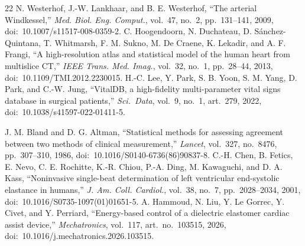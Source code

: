 \documentclass[journal]{IEEEtran}
\begin{document}
\begin{thebibliography}{22}
 N. Westerhof, J.-W. Lankhaar, and B. E. Westerhof, ``The arterial Windkessel,'' \emph{Med. Biol. Eng. Comput.}, vol.~47, no.~2, pp.~131--141, 2009, doi:~10.1007/s11517-008-0359-2.
 C. Hoogendoorn, N. Duchateau, D. S\'{a}nchez-Quintana, T. Whitmarsh, F. M. Sukno, M. De Craene, K. Lekadir, and A. F. Frangi, ``A high-resolution atlas and statistical model of the human heart from multislice CT,'' \emph{IEEE Trans. Med. Imag.}, vol.~32, no.~1, pp.~28--44, 2013, doi:~10.1109/TMI.2012.2230015.
 H.-C. Lee, Y. Park, S. B. Yoon, S. M. Yang, D. Park, and C.-W. Jung, ``VitalDB, a high-fidelity multi-parameter vital signs database in surgical patients,'' \emph{Sci.~Data}, vol.~9, no.~1, art.~279, 2022, doi:~10.1038/s41597-022-01411-5.

 J. M. Bland and D. G. Altman, ``Statistical methods for assessing agreement between two methods of clinical measurement,'' \emph{Lancet}, vol.~327, no.~8476, pp.~307--310, 1986, doi:~10.1016/S0140-6736(86)90837-8.
 C.-H. Chen, B. Fetics, E. Nevo, C. E. Rochitte, K.-R. Chiou, P.-A. Ding, M. Kawaguchi, and D. A. Kass, ``Noninvasive single-beat determination of left ventricular end-systolic elastance in humans,'' \emph{J. Am. Coll. Cardiol.}, vol.~38, no.~7, pp.~2028--2034, 2001, doi:~10.1016/S0735-1097(01)01651-5.
 A. Hammoud, N. Liu, Y. Le Gorrec, Y. Civet, and Y. Perriard, ``Energy-based control of a dielectric elastomer cardiac assist device,'' \emph{Mechatronics}, vol.~117, art.~no.~103515, 2026, doi:~10.1016/j.mechatronics.2026.103515.
\end{thebibliography}
\end{document}

